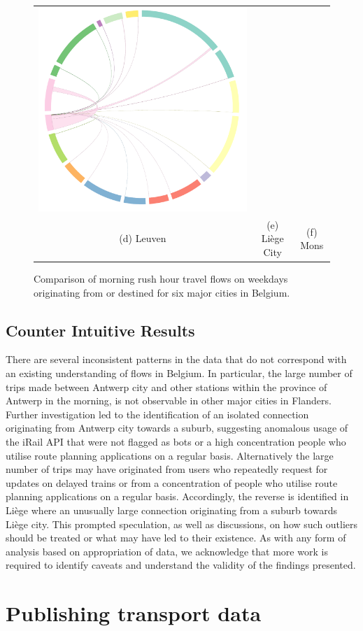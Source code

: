 \documentclass{sig-alternate}
\begin{document}
\begin{figure}[t]
\begin{tabular}{ccc}
  \includegraphics[width=.33\textwidth]{wd-mons.pdf}\\ 
  (d) Leuven&(e) Liège City&(f) Mons\\
\end{tabular}
\vspace{5.0pt}%
\caption{Comparison of morning rush hour travel flows on weekdays originating from or destined for six major cities in Belgium.}
\label{fig:cities}
\end{figure}


\subsection{Counter Intuitive Results}

There are several inconsistent patterns in the data that do not correspond with an existing understanding of flows in Belgium.
In particular, the large number of trips made between Antwerp city and other stations within the province of Antwerp in the morning, is not observable in other major cities in Flanders.
Further investigation led to the identification of an isolated connection originating from Antwerp city towards a suburb, suggesting anomalous usage of the iRail API that were not flagged as bots or a high concentration people who utilise route planning applications on a regular basis.
Alternatively the large number of trips may have originated from users who repeatedly request for updates on delayed trains or from a concentration of people who utilise route planning applications on a regular basis.
Accordingly, the reverse is identified in Liège where an unusually large connection originating from a suburb towards Liège city.
This prompted speculation, as well as discussions, on how such outliers should be treated or what may have led to their existence.
As with any form of analysis based on appropriation of data, we acknowledge that more work is required to identify caveats and understand the validity of the findings presented.

\section{Publishing transport data}
\label{sec:publishing}
\end{document}
